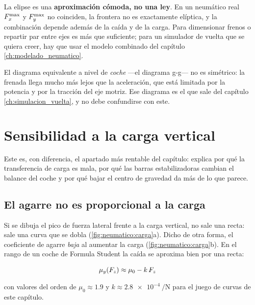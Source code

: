 \begin{ojo}
La elipse es una \textbf{aproximación cómoda, no una ley}. En un neumático real
$F_x^{\max}$ y $F_y^{\max}$ no coinciden, la frontera no es exactamente
elíptica, y la combinación depende además de la caída y de la carga. Para
dimensionar frenos o repartir par entre ejes es más que suficiente; para un
simulador de vuelta que se quiera creer, hay que usar el modelo combinado del
capítulo \ref{ch:modelado_neumatico}.

El diagrama equivalente a nivel de \emph{coche} ---el diagrama g-g--- no es
simétrico: la frenada llega mucho más lejos que la aceleración, que está
limitada por la potencia y por la tracción del eje motriz. Ese diagrama es el
que sale del capítulo \ref{ch:simulacion_vuelta}, y no debe confundirse con
este.
\end{ojo}

\section{Sensibilidad a la carga vertical}
\label{sec:neumatico:04}

Este es, con diferencia, el apartado más rentable del capítulo: explica por qué
la transferencia de carga es mala, por qué las barras estabilizadoras cambian el
balance del coche y por qué bajar el centro de gravedad da más de lo que parece.

\subsection{El agarre no es proporcional a la carga}

Si se dibuja el pico de fuerza lateral frente a la carga vertical, no sale una
recta: sale una curva que se dobla (\cref{fig:neumatico:carga}a). Dicho de otra
forma, el coeficiente de agarre \emph{baja} al aumentar la carga
(\cref{fig:neumatico:carga}b). En el rango de un coche de Formula Student la
caída se aproxima bien por una recta:

\begin{equation}
  \mu_y(F_z) \approx \mu_0 - k\,F_z
  \label{eq:sensibilidad_carga}
\end{equation}

con valores del orden de $\mu_0 \approx \num{1.9}$ y
$k \approx \SI{2.8e-4}{\per\newton}$ para el juego de curvas de este capítulo.

